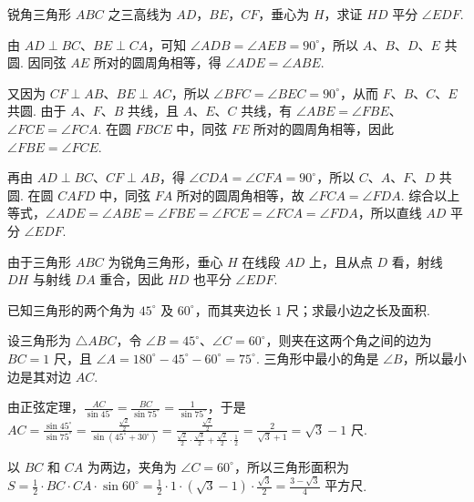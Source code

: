 \begin{problem}
锐角三角形 \(ABC\) 之三高线为 \(AD\)，\(BE\)，\(CF\)，垂心为 \(H\)，求证 \(HD\) 平分 \(\angle EDF\).
\end{problem}

\begin{solution}
由 \(AD\perp BC\)、\(BE\perp CA\)，可知 \(\angle ADB=\angle AEB=90^{\circ}\)，所以 \(A\)、\(B\)、\(D\)、\(E\) 共圆. 因同弦 \(AE\) 所对的圆周角相等，得 \(\angle ADE=\angle ABE\).

又因为 \(CF\perp AB\)、\(BE\perp AC\)，所以 \(\angle BFC=\angle BEC=90^{\circ}\)，从而 \(F\)、\(B\)、\(C\)、\(E\) 共圆. 由于 \(A\)、\(F\)、\(B\) 共线，且 \(A\)、\(E\)、\(C\) 共线，有 \(\angle ABE=\angle FBE\)、\(\angle FCE=\angle FCA\). 在圆 \(FBCE\) 中，同弦 \(FE\) 所对的圆周角相等，因此 \(\angle FBE=\angle FCE\).

再由 \(AD\perp BC\)、\(CF\perp AB\)，得 \(\angle CDA=\angle CFA=90^{\circ}\)，所以 \(C\)、\(A\)、\(F\)、\(D\) 共圆. 在圆 \(CAFD\) 中，同弦 \(FA\) 所对的圆周角相等，故 \(\angle FCA=\angle FDA\). 综合以上等式，\(\angle ADE=\angle ABE=\angle FBE=\angle FCE=\angle FCA=\angle FDA\)，所以直线 \(AD\) 平分 \(\angle EDF\).

由于三角形 \(ABC\) 为锐角三角形，垂心 \(H\) 在线段 \(AD\) 上，且从点 \(D\) 看，射线 \(DH\) 与射线 \(DA\) 重合，因此 \(HD\) 也平分 \(\angle EDF\).

\end{solution}

\begin{problem}
已知三角形的两个角为 \(45^{\circ}\) 及 \(60^{\circ}\)，而其夹边长 \(1\text{ 尺}\)；求最小边之长及面积.
\end{problem}

\begin{solution}
设三角形为 \(\triangle ABC\)，令 \(\angle B=45^{\circ}\)、\(\angle C=60^{\circ}\)，则夹在这两个角之间的边为 \(BC=1\text{ 尺}\)，且 \(\angle A=180^{\circ}-45^{\circ}-60^{\circ}=75^{\circ}\). 三角形中最小的角是 \(\angle B\)，所以最小边是其对边 \(AC\).

由正弦定理，\(\frac{AC}{\sin45^{\circ}}=\frac{BC}{\sin75^{\circ}}=\frac{1}{\sin75^{\circ}}\)，于是
\(AC=\frac{\sin45^{\circ}}{\sin75^{\circ}}=\frac{\frac{\sqrt2}{2}}{\sin\left(45^{\circ}+30^{\circ}\right)}=\frac{\frac{\sqrt2}{2}}{\frac{\sqrt2}{2}\cdot\frac{\sqrt3}{2}+\frac{\sqrt2}{2}\cdot\frac12}=\frac{2}{\sqrt3+1}=\sqrt3-1\text{ 尺}\).

以 \(BC\) 和 \(CA\) 为两边，夹角为 \(\angle C=60^{\circ}\)，所以三角形面积为 \(S=\frac12\cdot BC\cdot CA\cdot\sin60^{\circ}=\frac12\cdot1\cdot\left(\sqrt3-1\right)\cdot\frac{\sqrt3}{2}=\frac{3-\sqrt3}{4}\text{ 平方尺}\).
\end{solution}
